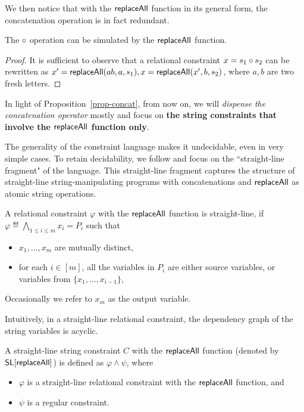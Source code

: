 We then notice that with the $\mathsf{replaceAll}$ function in its general form, the concatenation operation is in fact redundant.

\begin{proposition}\label{prop-concat}
	The $\circ$ operation can be simulated  by the $\mathsf{replaceAll}$ function.
\end{proposition}
\begin{proof}
	It is sufficient to observe that %
	a relational constraint $x = s_1 \circ s_2$ can be rewritten as $x' = \mathsf{replaceAll}(ab, a, s_1), x = \mathsf{replaceAll}(x', b, s_2)$, where $a,b$ are two fresh letters.
\end{proof}

In light of Proposition~\ref{prop-concat}, from now on, we will \emph{dispense the concatenation operator} mostly and focus on \textbf{the string constraints that involve  the $\mathsf{replaceAll}$ function only}.


\medskip

The generality of the constraint language makes it undecidable,
even in very simple cases. To retain decidability, we follow \cite{LB16} and focus on the ``straight-line fragment" of the language. This straight-line fragment captures the structure of straight-line string-manipulating
programs with concatenations and $\mathsf{replaceAll}$ as atomic string operations.  

\begin{definition}
	A relational constraint $ \varphi$ with the $\mathsf{replaceAll}$ function is straight-line, if $\varphi \eqdef \bigwedge \limits_{1 \le i \le m} x_i = P_i$ such that
	\begin{itemize}
		\item $x_1,\dots, x_m$ are mutually distinct,
		\item for each $i \in [m]$, all the variables in $P_i$ are either source variables, or variables from $\{x_1,\dots, x_{i-1}\}$,
	\end{itemize}
Occasionally we refer to $x_m$ as the output variable. 
\end{definition}
Intuitively, in a straight-line relational constraint, the dependency graph of the string variables is acyclic.



\begin{definition}
	A straight-line string constraint $C$ with the $\mathsf{replaceAll}$ function (denoted by $\mathsf{SL}[\mathsf{replaceAll}]$)  is defined as $ \varphi \wedge \psi$,  where 
	\begin{itemize}
		\item $\varphi$ is a straight-line relational constraint with the $\mathsf{replaceAll}$ function,  and
		\item $\psi$ is a regular constraint.
	\end{itemize}
\end{definition}

